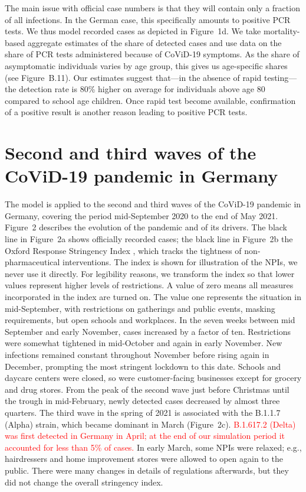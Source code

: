\documentclass[fleqn,10pt]{wlscirep}
\begin{document}
The main issue with official case numbers is that they will contain only a fraction of
all infections. In the German case, this specifically amounts to positive PCR tests. We
thus model recorded cases as depicted in Figure~1d. We take mortality-based aggregate
estimates of the share of detected cases and use data on the share of PCR tests
administered because of CoViD-19 symptoms. As the share of asymptomatic individuals
varies by age group, this gives us age-specific shares (see Figure~B.11). Our estimates
suggest that---in the absence of rapid testing---the detection rate is 80\% higher on
average for individuals above age 80 compared to school age children. Once rapid test
become available, confirmation of a positive result is another reason leading to
positive PCR tests.


\section*{Second and third waves of the CoViD-19 pandemic in Germany}

The model is applied to the second and third waves of the CoViD-19 pandemic in Germany,
covering the period mid-September 2020 to the end of May 2021. Figure~2 describes the
evolution of the pandemic and of its drivers. The black line in Figure~2a shows
officially recorded cases; the black line in Figure~2b the Oxford Response Stringency
Index \cite{Hale2020}, which tracks the tightness of non-pharmaceutical interventions.
The index is shown for illustration of the NPIs, we never use it directly. For
legibility reasons, we transform the index so that lower values represent higher levels
of restrictions. A value of zero means all measures incorporated in the index are turned
on. The value one represents the situation in mid-September, with restrictions on
gatherings and public events, masking requirements, but open schools and workplaces. In
the seven weeks between mid September and early November, cases increased by a factor of
ten. Restrictions were somewhat tightened in mid-October and again in early November.
New infections remained constant throughout November before rising again in December,
prompting the most stringent lockdown to this date. Schools and daycare centers were
closed, so were customer-facing businesses except for grocery and drug stores. From the
peak of the second wave just before Christmas until the trough in mid-February, newly
detected cases decreased by almost three quarters. The third wave in the spring of 2021
is associated with the B.1.1.7 (Alpha) strain, which became dominant in March
(Figure~2c). \textcolor{red}{B.1.617.2 (Delta) was first detected in Germany in April;
at the end of our simulation period it accounted for less than 5\% of cases.} In early
March, some NPIs were relaxed; e.g., hairdressers and home improvement stores were
allowed to open again to the public. There were many changes in details of regulations
afterwards, but they did not change the overall stringency index.
\end{document}
